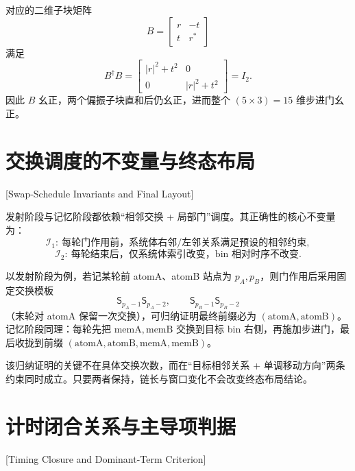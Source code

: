 对应的二维子块矩阵
\begin{equation}
B=
\begin{bmatrix}
r&-t\\
t&r^*
\end{bmatrix}
\label{eq:app-B}
\end{equation}
满足
\begin{equation}
B^\dagger B=
\begin{bmatrix}
|r|^2+t^2&0\\
0&|r|^2+t^2
\end{bmatrix}
=I_2.
\end{equation}
因此 $B$ 幺正，两个偏振子块直和后仍幺正，进而整个 $(5\times 3)=15$ 维步进门幺正。

\section{交换调度的不变量与终态布局}[Swap-Schedule Invariants and Final Layout]

发射阶段与记忆阶段都依赖“相邻交换 + 局部门”调度。其正确性的核心不变量为：
\begin{equation}
\mathcal{I}_1:\ \text{每轮门作用前，系统体右邻/左邻关系满足预设的相邻约束},
\end{equation}
\begin{equation}
\mathcal{I}_2:\ \text{每轮结束后，仅系统体索引改变，bin 相对时序不改变}.
\end{equation}

以发射阶段为例，若记某轮前 atomA、atomB 站点为 $p_A,p_B$，则门作用后采用固定交换模板
\begin{equation}
\mathsf{S}_{p_A-1}\mathsf{S}_{p_A-2},\qquad
\mathsf{S}_{p_B-1}\mathsf{S}_{p_B-2}
\end{equation}
（末轮对 atomA 保留一次交换），可归纳证明最终前缀必为 $(\mathrm{atomA,atomB})$。记忆阶段同理：每轮先把 $\mathrm{memA},\mathrm{memB}$ 交换到目标 bin 右侧，再施加步进门，最后收拢到前缀 $(\mathrm{atomA,atomB,memA,memB})$。

该归纳证明的关键不在具体交换次数，而在“目标相邻关系 + 单调移动方向”两条约束同时成立。只要两者保持，链长与窗口变化不会改变终态布局结论。

\section{计时闭合关系与主导项判据}[Timing Closure and Dominant-Term Criterion]

